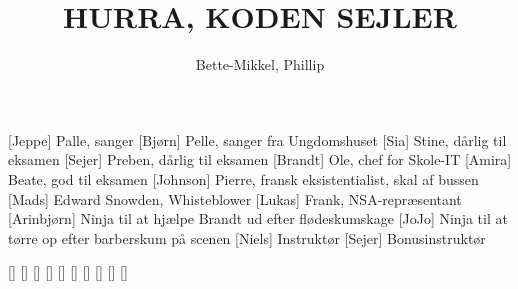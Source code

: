 \documentclass[a4paper,11pt]{article}
\title{HURRA, KODEN SEJLER}
\author{Bette-Mikkel, Phillip}
\begin{document}
\maketitle

\begin{roles}
[Jeppe] Palle, sanger
[Bjørn] Pelle, sanger fra Ungdomshuset
[Sia] Stine, dårlig til eksamen
[Sejer] Preben, dårlig til eksamen
[Brandt] Ole, chef for Skole-IT
[Amira] Beate, god til eksamen
[Johnson] Pierre, fransk eksistentialist, skal af bussen
[Mads] Edward Snowden, Whisteblower
[Lukas] Frank, NSA-repræsentant
[Arinbjørn] Ninja til at hjælpe Brandt ud efter flødeskumskage
[JoJo] Ninja til at tørre op efter barberskum på scenen
[Niels] Instruktør
[Sejer] Bonusinstruktør
\end{roles}

\begin{props}
[]
[]
[]
[]
[]
[]
[]
[]
[]
[]
\end{props}
\end{document}
